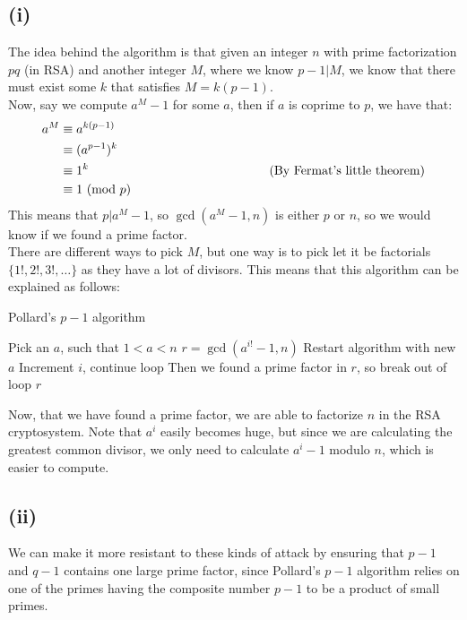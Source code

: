 \documentclass[a4paper, fleqn]{article}
\newcommand{\comment}[1]{%
  \text{\phantom{(#1)}} \tag{#1}}
\begin{document}
\subsection{(i)}
The idea behind the algorithm is that given an integer $n$ with prime factorization $pq$ (in RSA) and another integer $M$, where we know $p-1| M$, we know that there must exist some $k$ that satisfies $M=k(p-1)$. \\
Now, say we compute $a^M-1$ for some $a$, then if $a$ is coprime to $p$, we have that:
\begin{align*}
  a^M &\equiv a^{k(p-1)} \\
      &\equiv (a^{p-1})^k \\
      &\equiv 1^k \comment {By Fermat's little theorem} \\
      &\equiv 1 \mbox{ (mod $p$)}
\end{align*}
This means that $p|a^M-1$, so $\gcd(a^M-1, n)$ is either $p$ or $n$, so we would know if we found a prime factor. \\
There are different ways to pick $M$, but one way is to pick let it be factorials $\{1!, 2!, 3!, \ldots\}$ as they have a lot of divisors. This means that this algorithm can be explained as follows:
\begin{algorithm}[H]
  \caption{Pollard's $p-1$ algorithm}\label{alg1}
  \begin{algorithmic}[1]
    \Statex
      \State Pick an $a$, such that $1<a<n$
      \State $r=\gcd(a^{i!}-1, n)$
        \State Restart algorithm with new $a$
      \EndIf
        \State Increment $i$, continue loop
      \EndIf
        \State Then we found a prime factor in $r$, so break out of loop
      \EndIf
      \EndFor
      \State \Return $r$
  \end{algorithmic}
\end{algorithm}
Now, that we have found a prime factor, we are able to factorize $n$ in the RSA cryptosystem. Note that $a^i$ easily becomes huge, but since we are calculating the greatest common divisor, we only need to calculate $a^i-1$ modulo $n$, which is easier to compute.

\subsection{(ii)}
We can make it more resistant to these kinds of attack by ensuring that $p-1$ and $q-1$ contains one large prime factor, since Pollard's $p-1$ algorithm relies on one of the primes having the composite number $p-1$ to be a product of small primes.
\end{document}
